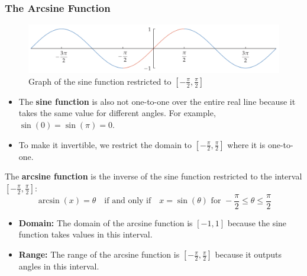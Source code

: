 \subsubsection{The Arcsine Function}
\begin{figure}
    \centering
    \includegraphics[scale=0.3]{pics/19.png}
    \caption{Graph of the sine function restricted to $[- \frac{\pi}{2}, \frac{\pi}{2}]$}
\end{figure}
\begin{itemize}
    \item The \textbf{sine function} is also not one-to-one over the entire real line because it takes the same value for different angles. For example, $\sin(0) = \sin(\pi) = 0$.
    \item To make it invertible, we restrict the domain to $[- \frac{\pi}{2}, \frac{\pi}{2}]$ where it is one-to-one.
\end{itemize}
The \textbf{arcsine function} is the inverse of the sine function restricted to the interval $[- \frac{\pi}{2}, \frac{\pi}{2}] $:
\[ \arcsin(x) = \theta \quad \text{if and only if} \quad x = \sin(\theta) \text{ for } -\frac{\pi}{2} \leq \theta \leq \frac{\pi}{2} \]
\begin{itemize}
    \item \textbf{Domain:} The domain of the arcsine function is $[-1, 1]$ because the sine function takes values in this interval.
    \item \textbf{Range:} The range of the arcsine function is $[- \frac{\pi}{2}, \frac{\pi}{2}]$ because it outputs angles in this interval.
\end{itemize}

